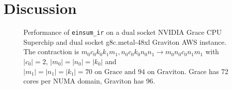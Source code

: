 \section{Discussion}

\begin{figure}
  \caption{
    Performance of \texttt{einsum\_ir} on a dual socket NVIDIA Grace CPU Superchip and dual socket g8c.metal-48xl Graviton AWS instance.
    The contraction is $m_0c_0k_0k_1m_1, n_0c_0k_0n_0n_1 \rightarrow m_0n_0c_0n_1m_1$ with $|c_0|=2$, $|m_0|=|n_0|=|k_0|$ and $|m_1|=|n_1|=|k_1|=70\text{ on Grace and } 94\text{ on Graviton}$.
    Grace has 72 cores per NUMA domain, Graviton has 96.
    }
  \label{c_perf}
\end{figure}
